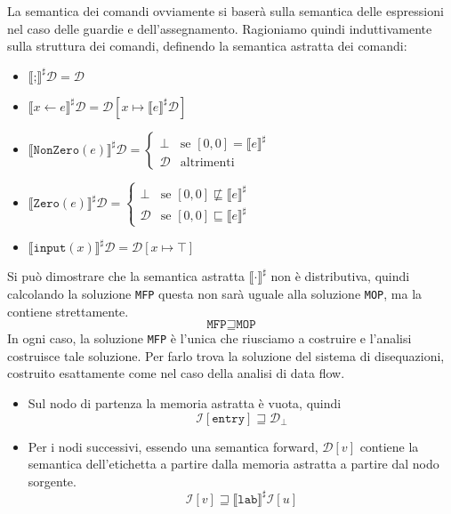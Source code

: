 La semantica dei comandi ovviamente si baserà sulla semantica delle espressioni 
nel caso delle guardie e dell'assegnamento. Ragioniamo quindi induttivamente sulla
struttura dei comandi, definendo la semantica astratta dei comandi:
\begin{itemize}
    \item $\llbracket \texttt{;} \rrbracket^\sharp \mathcal{D} = \mathcal{D}$
    \item $\llbracket x \gets e \rrbracket^\sharp \mathcal{D} =
    \mathcal{D}[x \mapsto \llbracket e \rrbracket^\sharp \mathcal{D}]$
    \item $\llbracket \texttt{NonZero}(e) \rrbracket^\sharp \mathcal{D} =
    \begin{cases}
        \bot & \text{se } [0, 0] = \llbracket e \rrbracket^\sharp \\
        \mathcal{D} & \text{altrimenti}
    \end{cases}
    $
    \item $\llbracket \texttt{Zero}(e) \rrbracket^\sharp \mathcal{D} =
    \begin{cases}
        \bot & \text{se } [0, 0] \not \sqsubseteq \llbracket e \rrbracket^\sharp \\
        \mathcal{D} & \text{se } [0, 0] \sqsubseteq \llbracket e \rrbracket^\sharp
    \end{cases}
    $
    \item $\llbracket \texttt{input}(x) \rrbracket^\sharp \mathcal{D} =
    \mathcal{D}[x \mapsto \top ]$
\end{itemize}
Si può dimostrare che la semantica astratta $\llbracket \cdot \rrbracket^\sharp$ non 
è distributiva, quindi calcolando la soluzione \texttt{MFP} questa non sarà uguale 
alla soluzione \texttt{MOP}, ma la contiene strettamente.
\[
  \texttt{MFP} \sqsupseteq \texttt{MOP}  
\]
In ogni caso, la soluzione \texttt{MFP} è l'unica che riusciamo a costruire e l'analisi 
costruisce tale soluzione. 
Per farlo trova la soluzione del sistema di disequazioni, costruito esattamente come nel 
caso della analisi di data flow.
\begin{itemize}
    \item Sul nodo di partenza la memoria astratta è vuota, quindi
    \[
        \mathcal{I}[\texttt{entry}] \sqsupseteq \mathcal{D}_\bot 
    \]
    \item Per i nodi successivi, essendo una semantica forward, $\mathcal{D}[v]$ contiene 
    la semantica dell'etichetta a partire dalla memoria astratta a 
    partire dal nodo sorgente.
    \[
        \mathcal{I}[v] \sqsupseteq \llbracket \texttt{lab} \rrbracket^\sharp \mathcal{I}[u]
    \]
\end{itemize}
